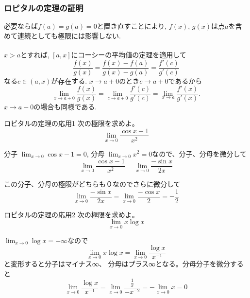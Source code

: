 \begin{frame}
\frametitle{ロピタルの定理の証明}
必要ならば$f(a)=g(a)=0$と置き直すことにより, $f(x)$, $g(x)$は点$a$を含めて連続としても極限には影響しない. \\
\ \\

$x>a$とすれば, $[a, x]$にコーシーの平均値の定理を適用して
$$
\frac{f(x)}{g(x)}=
\frac{f(x)-f(a)}{g(x)-g(a)}=
\frac{f'(c)}{g'(c)}
$$
なる$c \in (a,x)$が存在する. 
$x \to a+0$のとき$c \to a +0$であるから
$$
\lim_{x\to a+0}\frac{f(x)}{g(x)}  = \lim_{c \to a+0}\frac{f'(c)}{g'(c)}= \lim_{x\to a}\frac{f'(x)}{g'(x)}. 
$$
$x \to a-0$の場合も同様である. 

\end{frame}
\begin{slide}{ロピタルの定理の応用1}
次の極限を求めよ。
\begin{equation}
\lim_{x \to 0} \frac{\cos{x} - 1}{x^2} \nonumber
\end{equation}
\vspace{5mm}


分子 $\lim_{x\to0} \cos{x} - 1 = 0$, 分母 $\lim_{x\to 0}x^2 = 0$なので、分子、分母を微分して
\begin{equation}
\lim_{x \to 0} \frac{\cos{x} - 1}{x^2} = \lim_{x\to 0} \frac{-\sin{x}}{2x} \nonumber 
\end{equation}

この分子、分母の極限がどちらも０なのでさらに微分して
\begin{equation}
\lim_{x\to 0} \frac{-\sin{x}}{2x}=  \lim_{x\to 0} \frac{-\cos{x}}{2}=-\frac{1}{2}  \nonumber
\end{equation}


\end{slide}

\begin{slide}{ロピタルの定理の応用2}
次の極限を求めよ。
\begin{equation}
\lim_{x \to 0} x\log{x} \nonumber
\end{equation}
\vspace{5mm}


$\lim_{x\to 0} \log{x} = -\infty$なので
\begin{equation}
\lim_{x \to 0} x\log{x} = \lim_{x\to 0} \frac{\log{x}}{x^{-1}} \nonumber
\end{equation}
と変形すると分子はマイナス∞、 分母はプラス∞となる。分母分子を微分すると
\begin{equation}
\lim_{x\to 0} \frac{\log{x}}{x^{-1}}  = \lim_{x\to 0} \frac{\frac{1}{x}}{-x^{-2}}  = -\lim_{x\to 0} x = 0 \nonumber
\end{equation}

\end{slide}


